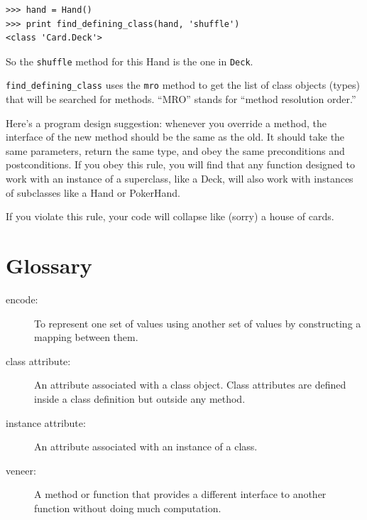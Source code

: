 \documentclass[10pt]{book}
\begin{document}
{\beforeverb
\begin{verbatim}
>>> hand = Hand()
>>> print find_defining_class(hand, 'shuffle')
<class 'Card.Deck'>
\end{verbatim}
\afterverb
%
So the {\tt shuffle} method for this Hand is the one in {\tt Deck}.


\verb"find_defining_class" uses the {\tt mro} method to get the list
of class objects (types) that will be searched for methods.  ``MRO''
stands for ``method resolution order.''


Here's a program design suggestion: whenever you override a method,
the interface of the new method should be the same as the old.  It
should take the same parameters, return the same type, and obey the
same preconditions and postconditions.  If you obey this rule, you
will find that any function designed to work with an instance of a
superclass, like a Deck, will also work with instances of subclasses
like a Hand or PokerHand.

If you violate this rule, your code will collapse like (sorry)
a house of cards.


\section{Glossary}

\begin{description}

\item[encode:]  To represent one set of values using another
set of values by constructing a mapping between them.

\item[class attribute:] An attribute associated with a class
object.  Class attributes are defined inside
a class definition but outside any method.

\item[instance attribute:] An attribute associated with an
instance of a class.

\item[veneer:] A method or function that provides a different
interface to another function without doing much computation.


\end{description}}
\end{document}
